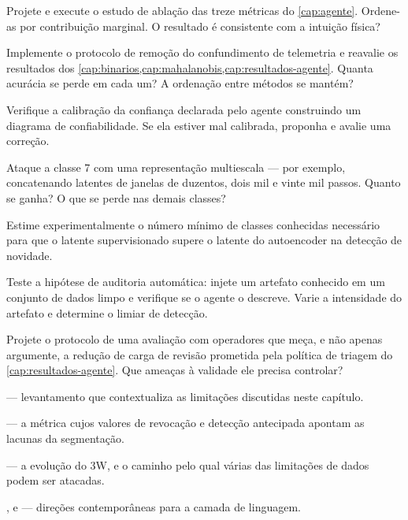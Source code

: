 \begin{projetospesquisa}
\item Projete e execute o estudo de ablação das treze métricas do \cref{cap:agente}.
      Ordene-as por contribuição marginal. O resultado é consistente com a intuição
      física?

\item Implemente o protocolo de remoção do confundimento de telemetria e reavalie os
      resultados dos \cref{cap:binarios,cap:mahalanobis,cap:resultados-agente}. Quanta
      acurácia se perde em cada um? A ordenação entre métodos se mantém?

\item Verifique a calibração da confiança declarada pelo agente construindo um diagrama
      de confiabilidade. Se ela estiver mal calibrada, proponha e avalie uma correção.

\item Ataque a classe 7 com uma representação multiescala --- por exemplo, concatenando
      latentes de janelas de duzentos, dois mil e vinte mil passos. Quanto se ganha? O
      que se perde nas demais classes?

\item Estime experimentalmente o número mínimo de classes conhecidas necessário para que
      o latente supervisionado supere o latente do autoencoder na detecção de novidade.

\item Teste a hipótese de auditoria automática: injete um artefato conhecido em um
      conjunto de dados limpo e verifique se o agente o descreve. Varie a intensidade do
      artefato e determine o limiar de detecção.

\item Projete o protocolo de uma avaliação com operadores que meça, e não apenas
      argumente, a redução de carga de revisão prometida pela política de triagem do
      \cref{cap:resultados-agente}. Que ameaças à validade ele precisa controlar?
\end{projetospesquisa}

\begin{leituras}
\item \citet{Pimentel2014review} --- levantamento que contextualiza as limitações
      discutidas neste capítulo.
\item \citet{Salles2024softed} --- a métrica cujos valores de revocação e detecção
      antecipada apontam as lacunas da segmentação.
\item \citet{VazVargas2026_3w2} --- a evolução do 3W, e o caminho pelo qual várias das
      limitações de dados podem ser atacadas.
\item \citet{Sharma2025xaiagents}, \citet{Belay2026agenticAD} e \citet{Zhang2026llmrules}
      --- direções contemporâneas para a camada de linguagem.
\end{leituras}
